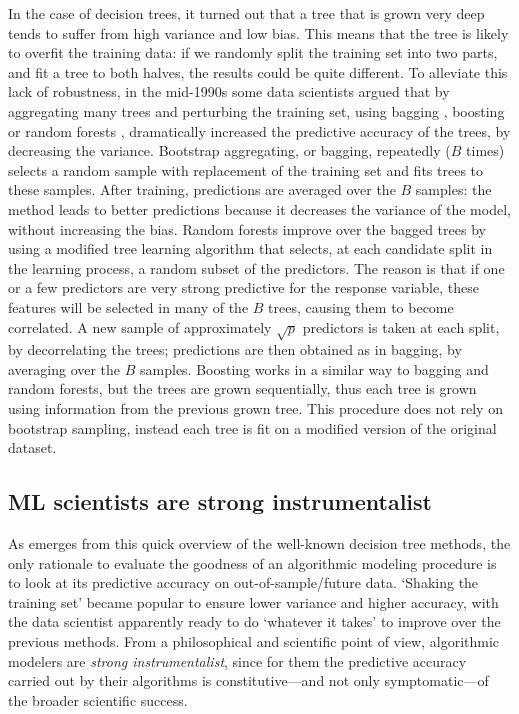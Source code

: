 \documentclass{statsoc}
\begin{document}
In the case of decision trees, it turned out that a tree that is grown very deep tends to suffer from high variance and low bias. This means that the tree is likely to 
overfit the training data: if we randomly split the training set into two parts, and fit a tree to both halves, the results could be quite different. To alleviate this lack of 
robustness, in the mid-1990s some data scientists argued that by aggregating many trees and perturbing the training set, using bagging \citep{breiman1996bagging}, boosting 
\citep{freund1996experiments} or random forests \citep{ho1995random}, dramatically increased the predictive accuracy of the trees, by decreasing the variance. Bootstrap 
aggregating, or bagging, repeatedly ($B$ times) selects a random sample with replacement of the training set and fits trees to these samples. After training, predictions are averaged 
over the $B$ samples: the method leads to better predictions  because it decreases the variance of the model, without increasing the bias. Random forests improve over the bagged 
trees by using a modified tree learning algorithm that selects, at each candidate split in the learning process, a random subset of the predictors. The reason is that if one or a few 
predictors are very strong predictive for the response variable, these features will be selected in many of the $B$ trees, causing them to become correlated. A new sample of 
approximately $\sqrt{p}$ predictors is taken at each split, by decorrelating the trees; predictions are then obtained as in bagging, by averaging over the $B$ samples. Boosting 
works in a similar way to bagging and random forests, but the trees are grown sequentially, thus each tree is grown using information from the previous grown tree. This procedure does 
not rely on bootstrap sampling, instead each tree is fit on a modified version of the original dataset.

\subsection{ML scientists are strong instrumentalist}

As emerges from this quick overview of the well-known decision tree methods, the only rationale to evaluate the goodness of an algorithmic modeling procedure is to look at its 
predictive accuracy on out-of-sample/future data. `Shaking the training set' became popular to ensure lower variance and higher accuracy, with the data scientist apparently ready to 
do `whatever it takes' to improve over the previous methods. From a philosophical and scientific point of view, algorithmic modelers are \emph{strong instrumentalist}, since for 
them the predictive accuracy carried out by their algorithms is constitutive---and not only symptomatic---of the broader scientific success.
\end{document}

